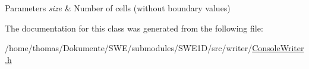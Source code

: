 \begin{DoxyParams}{Parameters}
{\em size} & Number of cells (without boundary values) \\
\hline
\end{DoxyParams}


The documentation for this class was generated from the following file\-:\begin{DoxyCompactItemize}
\item 
/home/thomas/\-Dokumente/\-S\-W\-E/submodules/\-S\-W\-E1\-D/src/writer/\hyperlink{ConsoleWriter_8h}{Console\-Writer.\-h}\end{DoxyCompactItemize}

